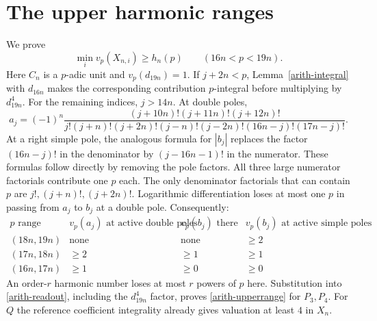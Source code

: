 \documentclass[11pt]{article}
\newcommand{\vp}{v_p}
\begin{document}
\section{The upper harmonic ranges}
We prove
\begin{equation}\label{arith-upperrange}
 \min_i\vp(X_{n,i})\geq h_n(p)\qquad(16n<p<19n).
\end{equation}
Here $C_n$ is a $p$-adic unit and $\vp(d_{19n})=1$.
If $j+2n<p$, Lemma~\ref{arith-integral} with $d_{16n}$ makes the corresponding
contribution $p$-integral before multiplying by $d_{19n}^4$.
For the remaining indices, $j>14n$.
At double poles,
\begin{equation}\label{arith-aformula}
 a_j=(-1)^n
 \frac{(j+10n)!(j+11n)!(j+12n)!}
 {j!(j+n)!(j+2n)!(j-n)!(j-2n)!(16n-j)!(17n-j)!}.
\end{equation}
At a right simple pole, the analogous formula for $|b_j|$ replaces
the factor $(16n-j)!$ in the denominator by $(j-16n-1)!$ in the
numerator. These formulas follow directly by removing the pole factors.
All three large numerator factorials contribute one $p$ each.
The only denominator factorials that can contain $p$ are
$j!,(j+n)!,(j+2n)!$. Logarithmic differentiation loses at most one
$p$ in passing from $a_j$ to $b_j$ at a double pole. Consequently:
\[
\begin{array}{c|c|c|c}
p\text{ range}&\vp(a_j)\text{ at active double poles}
 &\vp(b_j)\text{ there}&\vp(b_j)\text{ at active simple poles}\\\hline
(18n,19n)&\text{none}&\text{none}&\geq2\\
(17n,18n)&\geq2&\geq1&\geq1\\
(16n,17n)&\geq1&\geq0&\geq0
\end{array}
\]
An order-$r$ harmonic number loses at most $r$ powers of $p$ here.
Substitution into \eqref{arith-readout}, including the $d_{19n}^4$ factor,
proves \eqref{arith-upperrange} for $P_3,P_4$. For $Q$ the reference coefficient
integrality already gives valuation at least $4$ in $X_n$.
\end{document}
